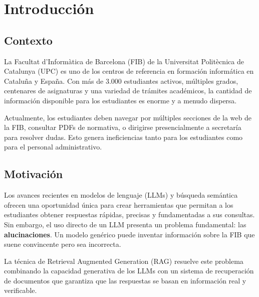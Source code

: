 \documentclass[12pt, a4paper, twoside]{report}
\begin{document}
\cleardoublepage
{}

\chapter{Introducci\'on}
\label{ch:introduccion}

\section{Contexto}

La Facultat d'Inform\`atica de Barcelona (FIB) de la Universitat Polit\`ecnica de Catalunya (UPC) es uno de los centros de referencia en formaci\'on inform\'atica en Catalu\~na y Espa\~na. Con m\'as de 3.000 estudiantes activos, m\'ultiples grados, centenares de asignaturas y una variedad de tr\'amites acad\'emicos, la cantidad de informaci\'on disponible para los estudiantes es enorme y a menudo dispersa.

Actualmente, los estudiantes deben navegar por m\'ultiples secciones de la web de la FIB, consultar PDFs de normativa, o dirigirse presencialmente a secretar\'ia para resolver dudas. Esto genera ineficiencias tanto para los estudiantes como para el personal administrativo.

\section{Motivaci\'on}

Los avances recientes en modelos de lenguaje (LLMs) y b\'usqueda sem\'antica ofrecen una oportunidad \'unica para crear herramientas que permitan a los estudiantes obtener respuestas r\'apidas, precisas y fundamentadas a sus consultas. Sin embargo, el uso directo de un LLM presenta un problema fundamental: las \textbf{alucinaciones}. Un modelo gen\'erico puede inventar informaci\'on sobre la FIB que suene convincente pero sea incorrecta.

La t\'ecnica de Retrieval Augmented Generation (RAG) resuelve este problema combinando la capacidad generativa de los LLMs con un sistema de recuperaci\'on de documentos que garantiza que las respuestas se basan en informaci\'on real y verificable.
\end{document}
